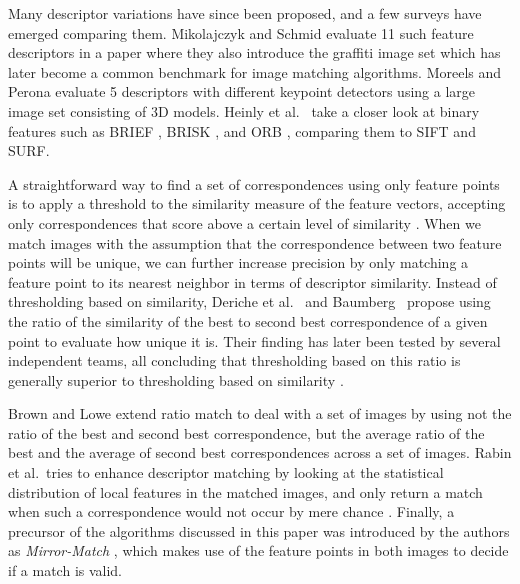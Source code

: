 \documentclass[10pt,journal,cspaper,compsoc]{IEEEtran}
\begin{document}
Many descriptor variations have since been proposed, and a few surveys 
have emerged comparing them. Mikolajczyk and Schmid \cite{mikolajczyk2005performance} evaluate 11 such 
feature descriptors in a paper where they also introduce the graffiti 
image set which has later become a common benchmark for image matching 
algorithms.  Moreels and Perona \cite{moreels2007evaluation}
evaluate 5 descriptors with different keypoint detectors using a large 
image set consisting of 3D models. 
Heinly et al.\ \cite{heinly2012comparative} take a closer look at binary features such as BRIEF 
\cite{calonder2010brief}, BRISK \cite{leutenegger2011brisk}, and ORB 
\cite{rublee2011orb}, comparing them to SIFT and SURF. 

A straightforward way to find a set of correspondences using only 
feature points is to apply a threshold to the similarity measure of the feature 
vectors, accepting only correspondences that score above a certain 
level of similarity \cite{szeliski2010}. When we match images with the assumption 
that the correspondence between two feature points will be unique, we can 
further increase precision by only matching a feature point to its 
nearest neighbor in terms of descriptor similarity. Instead of 
thresholding based on similarity, Deriche et 
al.~\cite{deriche1994robust} and Baumberg~\cite{baumberg2000reliable} 
propose using the ratio of the similarity of the best to second best 
correspondence of a given point to evaluate how unique it is. Their 
finding has later been tested by several independent teams, all 
concluding that thresholding based on this ratio is generally superior to 
thresholding based on similarity \cite{lowe2004sift,mikolajczyk2005performance,moreels2007evaluation,rabin2009statistical}. 

Brown and Lowe \cite{brown2005multi} extend ratio match to deal 
with a set of images by using not the ratio of the best and second best 
correspondence, but the average ratio of the best and the average of 
second best correspondences across a set of images.  Rabin et al.\ tries to enhance descriptor 
matching by looking at the statistical distribution of local features in 
the matched images, and only return a match when such a 
correspondence would not occur by mere chance 
\cite{rabin2009statistical}. Finally, a precursor of the algorithms 
discussed in this paper was introduced by the authors as 
\emph{Mirror-Match} \cite{arnfred2013mirror}, which makes use of the 
feature points in both images to decide if a match is valid.
\end{document}
